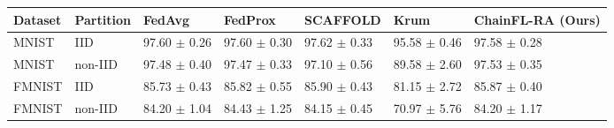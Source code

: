 \begin{tabular}{lllllll}
\toprule
Dataset & Partition & FedAvg & FedProx & SCAFFOLD & Krum & ChainFL-RA (Ours) \\
\midrule
MNIST & IID & 97.60 $\pm$ 0.26 & 97.60 $\pm$ 0.30 & 97.62 $\pm$ 0.33 & 95.58 $\pm$ 0.46 & 97.58 $\pm$ 0.28 \\
MNIST & non-IID & 97.48 $\pm$ 0.40 & 97.47 $\pm$ 0.33 & 97.10 $\pm$ 0.56 & 89.58 $\pm$ 2.60 & 97.53 $\pm$ 0.35 \\
FMNIST & IID & 85.73 $\pm$ 0.43 & 85.82 $\pm$ 0.55 & 85.90 $\pm$ 0.43 & 81.15 $\pm$ 2.72 & 85.87 $\pm$ 0.40 \\
FMNIST & non-IID & 84.20 $\pm$ 1.04 & 84.43 $\pm$ 1.25 & 84.15 $\pm$ 0.45 & 70.97 $\pm$ 5.76 & 84.20 $\pm$ 1.17 \\
\bottomrule
\end{tabular}
